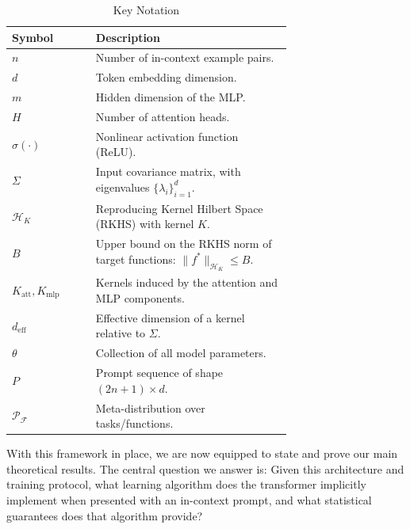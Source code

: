 \begin{table}[htbp]
	\centering
	\caption{Key Notation}
	\begin{tabular}{lp{0.7\linewidth}}
		\toprule
		Symbol & Description \\
		\midrule
		\( n \) & Number of in-context example pairs. \\
		\( d \) & Token embedding dimension. \\
		\( m \) & Hidden dimension of the MLP. \\
		\( H \) & Number of attention heads. \\
		\( \sigma(\cdot) \) & Nonlinear activation function (ReLU). \\
		\( \Sigma \) & Input covariance matrix, with eigenvalues \( \{\lambda_i\}_{i=1}^d \). \\
		\( \mathcal{H}_K \) & Reproducing Kernel Hilbert Space (RKHS) with kernel \( K \). \\
		\( B \) & Upper bound on the RKHS norm of target functions: \( \|f^*\|_{\mathcal{H}_K} \leq B \). \\
		\( K_{\text{att}}, K_{\text{mlp}} \) & Kernels induced by the attention and MLP components. \\
		\( d_{\text{eff}} \) & Effective dimension of a kernel relative to \( \Sigma \). \\
		\( \theta \) & Collection of all model parameters. \\
		\( P \) & Prompt sequence of shape \( (2n+1) \times d \). \\
		\( \mathcal{P}_{\mathcal{F}} \) & Meta-distribution over tasks/functions. \\
		\bottomrule
	\end{tabular}
	\label{tab:notation}
\end{table}

With this framework in place, we are now equipped to state and prove our main theoretical results. The central question we answer is: Given this architecture and training protocol, what learning algorithm does the transformer implicitly implement when presented with an in-context prompt, and what statistical guarantees does that algorithm provide?
